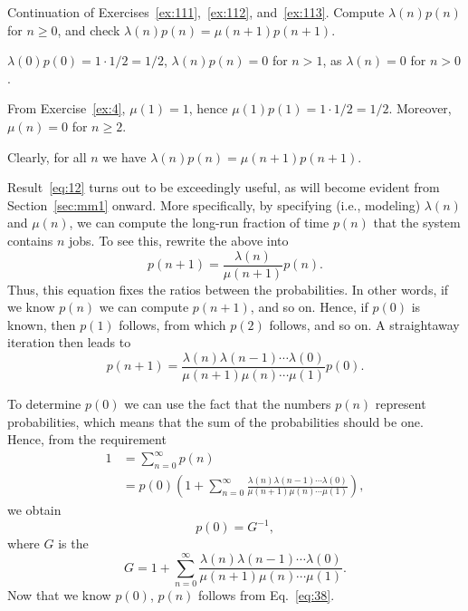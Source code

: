 \begin{exercise} Continuation of Exercises~\ref{ex:111},~\ref{ex:112}, and~\ref{ex:113}.  Compute 
$\lambda(n) p(n)$ for $n\geq 0$, and check $\lambda(n) p(n) = \mu(n+1) p(n+1)$. 
\begin{solution}
  $\lambda(0)p(0)=1\cdot 1/2 = 1/2$, $\lambda(n)p(n)= 0$ for $n>1$, as $\lambda(n)=0$ for $n>0$.

From Exercise~\ref{ex:4}, $\mu(1)=1$, hence $\mu(1) p(1) = 1\cdot 1/2 = 1/2$. Moreover, $\mu(n)=0$ for $n\geq 2$. 

Clearly, for all $n$ we have $\lambda(n)p(n)= \mu(n+1)p(n+1)$. 

\end{solution}
\end{exercise}

Result~\eqref{eq:12} turns out to be exceedingly useful, as will become evident from Section~\ref{sec:mm1} onward. More specifically, by specifying (i.e., modeling) $\lambda(n)$ and $\mu(n)$, we can compute the long-run fraction of
time $p(n)$ that the system contains $n$ jobs. To see this, rewrite
the above into
\begin{equation}\label{eq:25}
  p(n+1) = \frac{\lambda(n)}{\mu(n+1)}p(n). 
\end{equation}
Thus, this equation fixes the ratios between the probabilities. In other words, if we know $p(n)$ we can compute $p(n+1)$, and so on. Hence, if $p(0)$ is known, then $p(1)$ follows, from which $p(2)$
follows, and so on. A straightaway iteration then leads to
\begin{equation}\label{eq:38}
  p(n+1) = \frac{\lambda(n)\lambda(n-1)\cdots \lambda(0)}{\mu(n+1)\mu(n)\cdots \mu(1)}p(0).
\end{equation}

To determine $p(0)$ we can use the fact that the numbers $p(n)$ represent probabilities, which means that the sum of the probabilities should be one. Hence, from the requirement
\begin{align*}
1 
&= \sum_{n=0}^\infty p(n) \\
&= p(0) \left(1+\sum_{n=0}^\infty \frac{\lambda(n)\lambda(n-1)\cdots\lambda(0)}{\mu(n+1)\mu(n)\cdots \mu(1)}\right),
\end{align*}
we obtain  
\begin{equation*}
  p(0) = G^{-1},
\end{equation*}
where $G$ is the 
\begin{equation}
  \label{eq:20}
G = 1+\sum_{n=0}^\infty \frac{\lambda(n)\lambda(n-1)\cdots\lambda(0)}{\mu(n+1)\mu(n)\cdots \mu(1)}.
\end{equation}
Now that we know $p(0)$,  $p(n)$ follows from Eq.~\eqref{eq:38}. 

